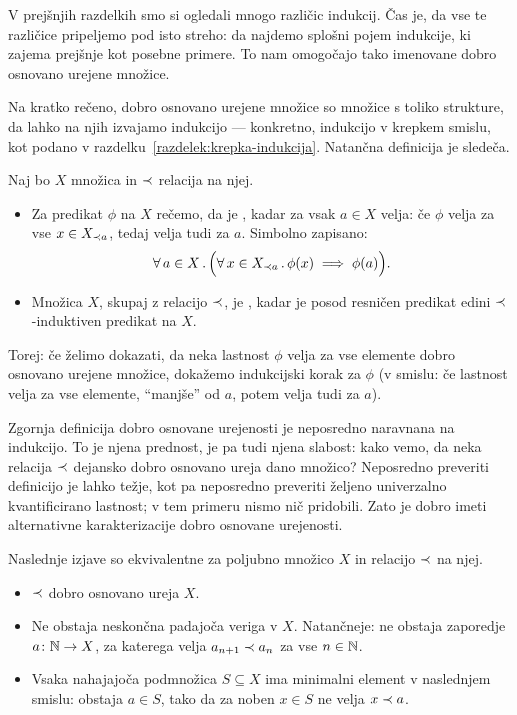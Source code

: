 V prejšnjih razdelkih smo si ogledali mnogo različic indukcij. Čas je, da vse te različice pripeljemo pod isto streho: da najdemo splošni pojem indukcije, ki zajema prejšnje kot posebne primere. To nam omogočajo tako imenovane dobro osnovano urejene množice.

Na kratko rečeno, dobro osnovano urejene množice so množice s toliko strukture, da lahko na njih izvajamo indukcijo --- konkretno, indukcijo v krepkem smislu, kot podano v razdelku~\ref{razdelek:krepka-indukcija}. Natančna definicija je sledeča.

\begin{definicija}
        Naj bo $X$ množica in $\prec$ relacija na njej.
        \begin{itemize}
                \item
                        Za predikat $\phi$ na $X$ rečemo, da je , kadar za vsak $a \in X$ velja: če $\phi$ velja za vse $x \in X_{\prec a}$, tedaj velja tudi za $a$. Simbolno zapisano:
                        \[\all[2]{a}[X]{\xall{x}[X_{\wf a}]{\phi(x)} \implies \phi(a)}.\]
                \item
                        Množica $X$, skupaj z relacijo $\prec$, je , kadar je posod resničen predikat edini $\prec$-induktiven predikat na $X$.
        \end{itemize}
\end{definicija}

Torej: če želimo dokazati, da neka lastnost $\phi$ velja za vse elemente dobro osnovano urejene množice, dokažemo indukcijski korak za $\phi$ (v smislu: če lastnost velja za vse elemente, ``manjše'' od $a$, potem velja tudi za $a$).

Zgornja definicija dobro osnovane urejenosti je neposredno naravnana na indukcijo. To je njena prednost, je pa tudi njena slabost: kako vemo, da neka relacija $\prec$ dejansko dobro osnovano ureja dano množico? Neposredno preveriti definicijo je lahko težje, kot pa neposredno preveriti željeno univerzalno kvantificirano lastnost; v tem primeru nismo nič pridobili. Zato je dobro imeti alternativne karakterizacije dobro osnovane urejenosti.

\begin{izrek}
        Naslednje izjave so ekvivalentne za poljubno množico $X$ in relacijo $\prec$ na njej.
        \begin{itemize}
                \item
                        $\prec$ dobro osnovano ureja $X$.
                \item
                        Ne obstaja neskončna padajoča veriga v $X$. Natančneje: ne obstaja zaporedje $a\colon \mathbb{N} \to X$, za katerega velja $a_{n+1} \prec a_n$ za vse $n \in \mathbb{N}$.
                \item
                        Vsaka nahajajoča podmnožica $S \subseteq X$ ima minimalni element v naslednjem smislu: obstaja $a \in S$, tako da za noben $x \in S$ ne velja $x \prec a$.
        \end{itemize}
\end{izrek}

